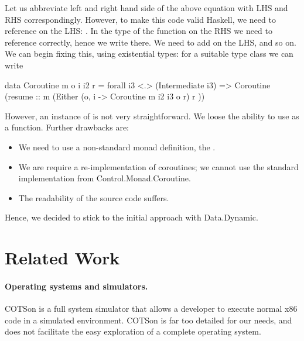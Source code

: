 Let us abbreviate left and right hand side of the above equation with LHS and RHS correspondingly.
However, to make this code valid Haskell, we need to reference  on the LHS: .
In the type of the  function on the RHS we need to reference  correctly, hence we write  there.
We need to add  on the LHS, and so on.
We can begin fixing this, using existential types: for a suitable type class
 we can write
\begin{code}
data Coroutine m o i i2 r
        =  forall i3 <.> (Intermediate i3) 
           =>  Coroutine (resume :: m (Either
                                      (o, i -> Coroutine m i2 i3 o r)
                                      r ))
\end{code}
However, an instance of  is not very
straightforward. We loose the ability to use  as a
function. Further drawbacks are:
\begin{itemize}
\item We need to use a non-standard monad definition, the .
\item We are require a re-implementation of coroutines; we cannot use
  the standard implementation from \textsf{Control.Monad.Coroutine}.
\item The readability of the source code suffers.
\end{itemize}
Hence, we decided to stick to the initial approach with \textsf{Data.Dynamic}.

\section{Related Work}
\label{sec:related-work}

\paragraph{Operating systems and simulators.}
COTSon \cite{cotson} is a full system simulator that allows a developer to execute normal x86 code in a simulated environment.
COTSon is far too detailed for our needs, and does not facilitate the easy exploration of a complete operating system.

